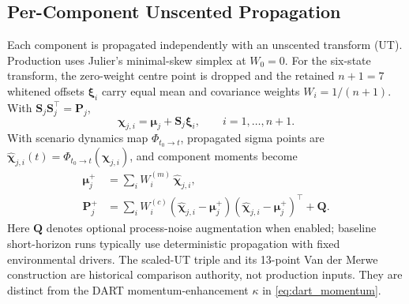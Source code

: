     \subsection{Per-Component Unscented Propagation}
    Each component is propagated independently with an unscented transform (UT). Production uses
    Julier's minimal-skew simplex at \(W_0=0\). For the six-state transform, the zero-weight centre
    point is dropped and the retained \(n+1=7\) whitened offsets
    \(\boldsymbol{\xi}_i\) carry equal mean and covariance weights
    \(W_i=1/(n+1)\). With \(\mathbf{S}_j\mathbf{S}_j^\top=\mathbf{P}_j\),
    \begin{equation}
        \boldsymbol{\chi}_{j,i}=\boldsymbol{\mu}_j+\mathbf{S}_j\boldsymbol{\xi}_i,
        \qquad i=1,\ldots,n+1.
    \end{equation}
    With scenario dynamics map \(\Phi_{t_0\rightarrow t}\), propagated sigma points are \(\hat{\boldsymbol{\chi}}_{j,i}(t)=\Phi_{t_0\rightarrow t}(\boldsymbol{\chi}_{j,i})\), and component moments become
    \begin{align}
        \boldsymbol{\mu}_j^{+} &= \sum_i W_i^{(m)}\,\hat{\boldsymbol{\chi}}_{j,i},\\
        \mathbf{P}_j^{+} &= \sum_i W_i^{(c)}\!\left(\hat{\boldsymbol{\chi}}_{j,i}-\boldsymbol{\mu}_j^{+}\right)\!\left(\hat{\boldsymbol{\chi}}_{j,i}-\boldsymbol{\mu}_j^{+}\right)^\top + \mathbf{Q}.
    \end{align}
    Here \(\mathbf{Q}\) denotes optional process-noise augmentation when enabled; baseline short-horizon runs typically use deterministic propagation with fixed environmental drivers. The scaled-UT triple and its 13-point Van der Merwe construction are historical comparison authority, not production inputs. They are distinct from the DART momentum-enhancement \(\kappa\) in \cref{eq:dart_momentum}.

